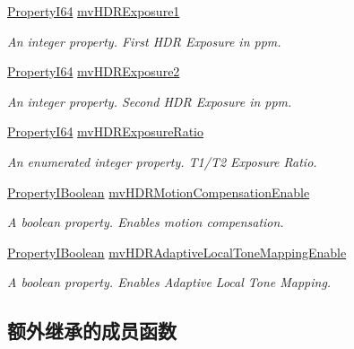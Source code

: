 \begin{DoxyCompactItemize}
\hyperlink{group___common_interface_ga81749b2696755513663492664a18a893}{Property\+I64} \hyperlink{classmv_i_m_p_a_c_t_1_1acquire_1_1_gen_i_cam_1_1mv_h_d_r_control_afe30d67ae209916f3c18a85b08e87233}{mv\+H\+D\+R\+Exposure1}
\begin{DoxyCompactList}\small\item\em An integer property. First H\+D\+R Exposure in ppm. \end{DoxyCompactList}\item 
\hyperlink{group___common_interface_ga81749b2696755513663492664a18a893}{Property\+I64} \hyperlink{classmv_i_m_p_a_c_t_1_1acquire_1_1_gen_i_cam_1_1mv_h_d_r_control_a97353e6296a61303ca64ff9ce8fda3e9}{mv\+H\+D\+R\+Exposure2}
\begin{DoxyCompactList}\small\item\em An integer property. Second H\+D\+R Exposure in ppm. \end{DoxyCompactList}\item 
\hyperlink{group___common_interface_ga81749b2696755513663492664a18a893}{Property\+I64} \hyperlink{classmv_i_m_p_a_c_t_1_1acquire_1_1_gen_i_cam_1_1mv_h_d_r_control_a88c75307ed2be02b283ad488a94a7c3c}{mv\+H\+D\+R\+Exposure\+Ratio}
\begin{DoxyCompactList}\small\item\em An enumerated integer property. T1/\+T2 Exposure Ratio. \end{DoxyCompactList}\item 
\hyperlink{group___common_interface_ga44f9437e24b21b6c93da9039ec6786aa}{Property\+I\+Boolean} \hyperlink{classmv_i_m_p_a_c_t_1_1acquire_1_1_gen_i_cam_1_1mv_h_d_r_control_a4f7203aa89d71498b98bc2d2c804d92c}{mv\+H\+D\+R\+Motion\+Compensation\+Enable}
\begin{DoxyCompactList}\small\item\em A boolean property. Enables motion compensation. \end{DoxyCompactList}\item 
\hyperlink{group___common_interface_ga44f9437e24b21b6c93da9039ec6786aa}{Property\+I\+Boolean} \hyperlink{classmv_i_m_p_a_c_t_1_1acquire_1_1_gen_i_cam_1_1mv_h_d_r_control_a350538f8e9bd428ba68297fdedf10e0e}{mv\+H\+D\+R\+Adaptive\+Local\+Tone\+Mapping\+Enable}
\begin{DoxyCompactList}\small\item\em A boolean property. Enables Adaptive Local Tone Mapping. \end{DoxyCompactList}\end{DoxyCompactItemize}
\subsection*{额外继承的成员函数}


